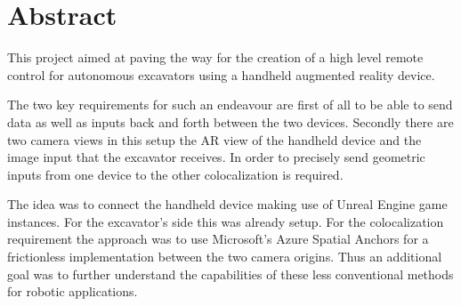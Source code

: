 \chapter{Abstract}


This project aimed at paving the way for the creation of a high level remote control for autonomous excavators using a handheld augmented reality device. 

The two key requirements for such an endeavour are first of all to be able to send data as well as inputs back and forth between the two devices. Secondly there are two camera views in this setup the AR view of the handheld device and the image input that the excavator receives. In order to precisely send geometric inputs from one device to the other colocalization is required. 

The idea was to connect the handheld device making use of Unreal Engine game instances. For the excavator's side this was already setup. For the colocalization requirement the approach was to use Microsoft's Azure Spatial Anchors for a frictionless implementation between the two camera origins. Thus an additional goal was to further understand the capabilities of these less conventional methods for robotic applications.